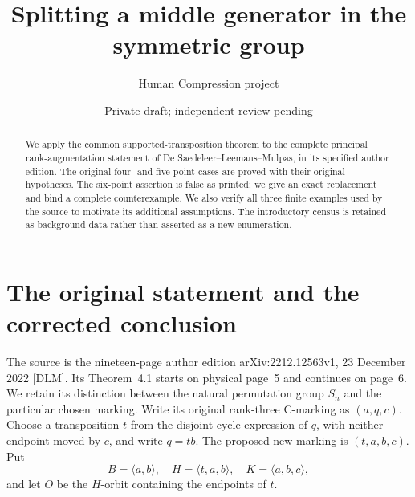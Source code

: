 \documentclass[a4paper,11pt]{article}
\title{Splitting a middle generator in the symmetric group}
\author{Human Compression project}\date{Private draft; independent review pending}
\newcommand{\gen}[1]{\langle#1\rangle}
\begin{document}
\maketitle
\begin{abstract}
We apply the common supported-transposition theorem to the complete
principal rank-augmentation statement of De Saedeleer--Leemans--Mulpas,
in its specified author edition. The original four- and five-point cases
are proved with their original hypotheses. The six-point assertion is
false as printed; we give an exact replacement and bind a complete
counterexample. We also verify all three finite examples used by the
source to motivate its additional assumptions. The introductory census
is retained as background data rather than asserted as a new enumeration.
\end{abstract}

\section{The original statement and the corrected conclusion}
The source is the nineteen-page author edition
arXiv:2212.12563v1, 23 December 2022 [DLM]. Its Theorem~4.1 starts on
physical page~5 and continues on page~6. We retain its distinction
between the natural permutation group $S_n$ and the particular chosen
marking. Write its original rank-three C-marking as $(a,q,c)$.
Choose a transposition $t$ from the disjoint cycle expression of $q$,
with neither endpoint moved by $c$, and write $q=tb$. The proposed
new marking is $(t,a,b,c)$. Put
\[
 B=\gen{a,b},\quad H=\gen{t,a,b},\quad K=\gen{a,b,c},
\]
and let $O$ be the $H$-orbit containing the endpoints of $t$.
\end{document}
